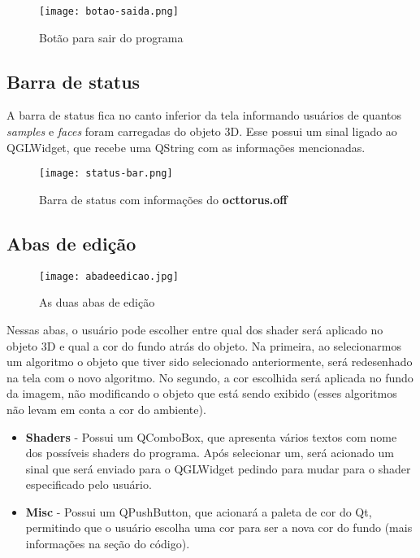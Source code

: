 \begin{figure}[H]
    \centering
    \texttt{[image: botao-saida.png]}
    \caption{Botão para sair do programa}
\end{figure}

\subsection{Barra de status}

A barra de status fica no canto inferior da tela 
informando usuários de quantos \emph{samples} e \emph{faces} foram carregadas 
do objeto 3D.
Esse possui um sinal ligado ao QGLWidget, que recebe 
uma QString com as informações mencionadas.

\begin{figure}[H]
    \centering
    \texttt{[image: status-bar.png]}
    \caption{Barra de status com informações do \textbf{octtorus.off}}
\end{figure}

\newpage

\subsection{Abas de edição}

\begin{figure}[H]
    \centering
    \texttt{[image: abadeedicao.jpg]}
    \caption{As duas abas de edição}
\end{figure}

Nessas abas, o usuário pode escolher entre qual dos shader será aplicado no objeto 3D
e qual a cor do fundo atrás do objeto. Na primeira, ao selecionarmos um algoritmo
o objeto que tiver sido selecionado anteriormente, será redesenhado na tela com o novo
algoritmo. No segundo, a cor escolhida será aplicada no fundo da imagem, não modificando
o objeto que está sendo exibido (esses algoritmos não levam em conta a cor do ambiente). 

\begin{itemize}
    \item \textbf{Shaders} - Possui um QComboBox, que apresenta 
    vários textos com nome dos possíveis shaders do 
    programa. Após selecionar um, será acionado um sinal 
    que será enviado para o QGLWidget pedindo para mudar 
    para o shader especificado pelo usuário.
    \item \textbf{Misc} - Possui um QPushButton, que acionará a 
    paleta de cor do Qt, permitindo que o usuário escolha 
    uma cor para ser a nova cor do fundo (mais informações 
    na seção do código).
\end{itemize}

\newpage
